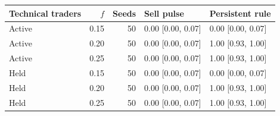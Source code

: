 \begin{center}
\begin{minipage}{\linewidth}\centering
\captionsetup{type=table,hypcap=false}
\caption{Asking selected traders to sell once (Sell pulse) versus keeping Rule~19286 in use. Both comparisons used the same traders and 3,000 steps after the change. Entries are majority probabilities with 95\% Wilson intervals; the dealer was unlimited under both technical-trader conditions.}
\label{tab:revision-pulse}
\small
\begin{tabular}{lrrll}
\toprule
Technical traders & $f$ & Seeds & Sell pulse & Persistent rule \\
\midrule
Active & 0.15 & 50 & 0.00 [0.00, 0.07] & 0.00 [0.00, 0.07] \\
Active & 0.20 & 50 & 0.00 [0.00, 0.07] & 1.00 [0.93, 1.00] \\
Active & 0.25 & 50 & 0.00 [0.00, 0.07] & 1.00 [0.93, 1.00] \\
Held & 0.15 & 50 & 0.00 [0.00, 0.07] & 0.00 [0.00, 0.07] \\
Held & 0.20 & 50 & 0.00 [0.00, 0.07] & 1.00 [0.93, 1.00] \\
Held & 0.25 & 50 & 0.00 [0.00, 0.07] & 1.00 [0.93, 1.00] \\
\bottomrule
\end{tabular}
\end{minipage}
\end{center}

